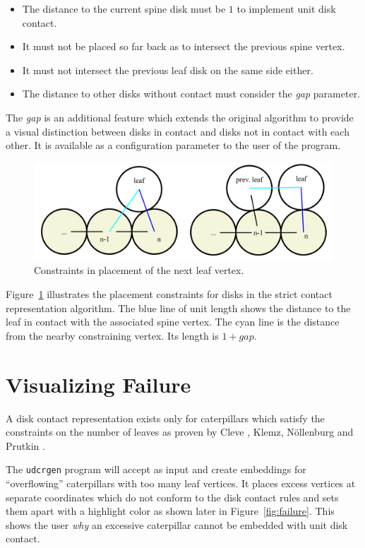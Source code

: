 \documentclass[draft,final]{vutinfth} %
\begin{document}
\begin{itemize}
    \item The distance to the current spine disk must be $1$ to implement unit disk contact.
    \item It must not be placed so far back as to intersect the previous spine vertex.
    \item It must not intersect the previous leaf disk on the same side either.
    \item The distance to other disks without contact must consider the \emph{gap} parameter.
\end{itemize}

The \emph{gap} is an additional feature which extends the original algorithm to provide a visual distinction between disks in contact and disks not in contact with each other. It is available as a configuration parameter to the user of the program.

\begin{figure}
    \centering
    \includegraphics[width=\textwidth]{graphics/strict_contact.png}
    \caption{Constraints in placement of the next leaf vertex.}
    \label{fig:strict_contact}
\end{figure}

Figure~\ref{fig:strict_contact} illustrates the placement constraints for disks in the strict contact representation algorithm. The blue line of unit length shows the distance to the leaf in contact with the associated spine vertex. The cyan line is the distance from the nearby constraining vertex. Its length is $1 + gap$.

\section{Visualizing Failure}

A disk contact representation exists only for caterpillars which satisfy the constraints on the number of leaves as proven by Cleve \cite{Cleve2020}, Klemz, Nöllenburg and Prutkin \cite{Klemz2015}.

The \texttt{udcrgen} program will accept as input and create embeddings for ``overflowing'' caterpillars with too many leaf vertices.
It places excess vertices at separate coordinates which do not conform to the disk contact rules and sets them apart with a highlight color as shown later in Figure~\ref{fig:failure}. This shows the user \emph{why} an excessive caterpillar cannot be embedded with unit disk contact.
\end{document}
